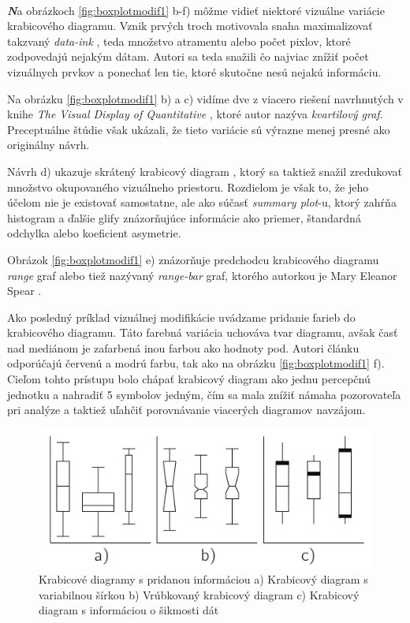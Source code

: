 \paragraph{}
{\large \textbf{\textit{N}}}a obrázkoch \ref{fig:boxplotmodif1} b-f) môžme vidieť niektoré vizuálne variácie krabicového diagramu. Vznik prvých troch motivovala snaha maximalizovať takzvaný \textit{data-ink} \cite{Tufte83}, teda množstvo atramentu alebo počet pixlov, ktoré zodpovedajú nejakým dátam. Autori sa teda snažili čo najviac znížiť počet vizuálnych prvkov a ponechať len tie, ktoré skutočne nesú nejakú informáciu. 

Na obrázku \ref{fig:boxplotmodif1} b) a c) vidíme dve z viacero riešení navrhnutých v knihe \textit{The Visual Display of Quantitative} \cite{Tufte83}, ktoré autor nazýva \textit{kvartilový graf}. Preceptuálne štúdie \cite{Stock} však ukázali, že tieto variácie sú výrazne menej presné ako originálny návrh.

Návrh d) ukazuje skrátený krabicový diagram \cite{VisualSummaryPotter}, ktorý sa taktiež snažil zredukovať množstvo okupovaného vizuálneho priestoru. Rozdielom je však to, že jeho účelom nie je existovať samostatne, ale ako súčasť \textit{summary plot}-u, ktorý zahŕňa histogram a ďalšie glify znázorňujúce informácie ako priemer, štandardná odchylka alebo koeficient asymetrie.

Obrázok \ref{fig:boxplotmodif1} e) znázorňuje predchodcu krabicového diagramu \textit{range} graf alebo tiež nazývaný \textit{range-bar} graf, ktorého autorkou je Mary Eleanor Spear \cite{Spear}.

Ako posledný príklad vizuálnej modifikácie uvádzame pridanie farieb do krabicového diagramu. Táto farebná variácia uchováva tvar diagramu, avšak časť nad mediánom je zafarbená inou farbou ako hodnoty pod. Autori článku odporúčajú červenú a modrú farbu, tak ako na obrázku \ref{fig:boxplotmodif1} f). Cieľom tohto prístupu bolo chápať krabicový diagram ako jednu percepčnú jednotku a nahradiť 5 symbolov jedným, čím sa mala znížiť námaha pozorovateľa pri analýze a taktiež uľahčiť porovnávanie viacerých diagramov navzájom. 


\begin{figure}
	\centering
	\includegraphics[width = 6in]{boxplot3}
	\caption{Krabicové diagramy s pridanou informáciou a) Krabicový diagram s variabilnou šírkou \cite{McGill} b) Vrúbkovaný krabicový diagram \cite{McGill} c) Krabicový diagram s informáciou o šikmosti dát \cite{Chamnein}}
	\label{fig:boxplotmodif2}
\end{figure}


